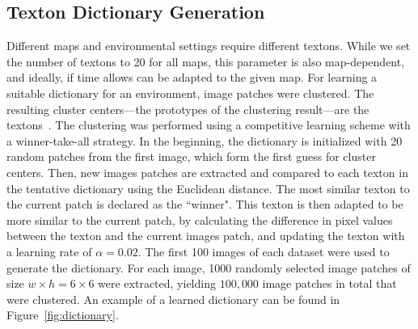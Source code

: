\subsection{Texton Dictionary Generation}
\label{sec:text-dict-gener}

Different maps and environmental settings require different textons. While we set the number of textons to 20 for all maps, this parameter is also map-dependent, and ideally, if time allows can be adapted to the given map. For learning a suitable dictionary for an environment, image patches were clustered. The resulting cluster centers---the prototypes of the
clustering result---are the textons~\cite{varma2003texture}.  The clustering was performed using a competitive learning scheme with a winner-take-all strategy. 
In the beginning, the dictionary is initialized with 20 random patches from the first image, which form the first guess for cluster centers. Then, new images patches are extracted and  compared to each texton in the tentative dictionary using the Euclidean distance. The most similar texton to the current patch is declared as the ``winner". This texton is then adapted to be more similar to the current patch, by calculating the difference in pixel values between the texton and the current images patch, and updating the texton with a learning rate of $\alpha = 0.02$. The first 100 images of each dataset were used to generate the dictionary. For each image, 1000 randomly selected image patches of size $w \times h = 6 \times 6$ were extracted, yielding $100,000$ image patches in total that were clustered.  An example of a learned dictionary can be found in Figure~\ref{fig:dictionary}.